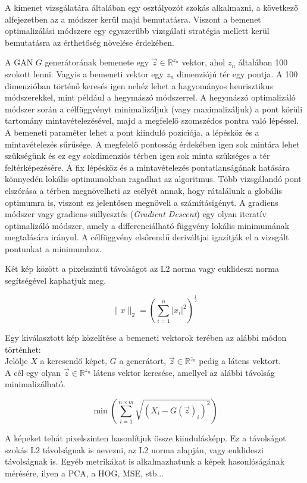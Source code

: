 A kimenet vizsgálatára általában egy osztályozót szokás alkalmazni, a következő alfejezetben az a módszer kerül majd bemutatásra. Viszont a bemenet optimalizálási módszere egy egyszerűbb vizsgálati stratégia mellett kerül bemutatásra az érthetőség növelése érdekében.

A GAN $G$ generátorának bemenete egy $\vec{z} \in \mathbb{R}^{z_n}$ vektor, ahol $z_n$ általában 100 szokott lenni. Vagyis a bemeneti vektor egy $z_n$ dimenziójú tér egy pontja. A 100 dimenzióban történő keresés igen nehéz lehet a hagyományos heurisztikus módszerekkel, mint például a hegymászó módszerrel. A hegymászó optimalizáló módszer során a célfüggvényt minimalizáljuk (vagy maximalizáljuk) a pont körüli tartomány mintavételezésével, majd a megfelelő szomszédos pontra való lépéssel. A bemeneti paraméter lehet a pont kiinduló pozíciója, a lépésköz és a mintavételezés sűrűsége. A megfelelő pontosság érdekében igen sok mintára lehet szükségünk és ez egy sokdimenziós térben igen sok minta szükséges a tér feltérképezésére. A fix lépésköz és a mintavételezés pontatlanságának hatására könnyedén lokális optimumokban ragadhat az algoritmus. Több vizsgálandó pont elszórása a térben megnövelheti az esélyét annak, hogy rátalálunk a globális optimumra is, viszont ez jelentősen megnöveli a számításigényt.
A gradiens módszer vagy gradiens-süllyesztés (\textit{Gradient Descent}) egy olyan iteratív optimalizáló módszer, amely a differenciálható függvény lokális minimumának megtalására irányul. A célfüggvény elsőrendű deriváltjai igazítják el a vizsgált pontunkat a minimumhoz. \cite{ruder2016overview}

Két kép között a pixelszintű távolságot az L2 norma vagy euklideszi norma segítségével kaphatjuk meg.

$$ \|x\|_2 = \left({\sum_{i=1}^{n}|x_i|^2}\right)^{\frac{1}{2}} $$

Egy kiválasztott kép közelítése a bemeneti vektorok terében az alábbi módon történhet:\\ 
Jelölje $X$ a keresendő képet, $G$ a generátort, $\vec{z} \in \mathbb{R}^{z_n}$ pedig a látens vektort.\\
A cél egy olyan $\vec{z} \in \mathbb{R}^{z_n}$ látens vektor keresése, amellyel az alábbi távolság minimalizálható.

$$ \min\left(\sum_{i=1}^{n\times m}\sqrt{(X_i-G(\vec{z})_i)^2}\right)$$

A képeket tehát pixelszinten hasonlítjuk össze kiindulásképp. Ez a távolságot szokás L2 távolságnak is nevezni, az L2 norma alapján, vagy euklideszi távolságnak is.
Egyéb metrikákat is alkalmazhatunk a képek hasonlóságának mérésére, ilyen a PCA, a HOG, MSE, stb...

